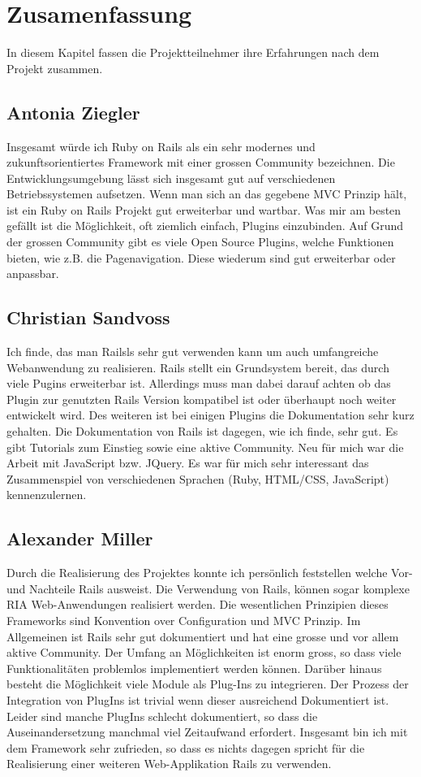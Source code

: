 \chapter{Zusamenfassung}
\label{sec:Zusammenfassung}
In diesem Kapitel fassen die Projektteilnehmer ihre Erfahrungen nach dem Projekt zusammen.
\section{Antonia Ziegler}
Insgesamt würde ich Ruby on Rails als ein sehr modernes und zukunftsorientiertes Framework mit einer grossen Community bezeichnen.
Die Entwicklungsumgebung lässt sich insgesamt gut auf verschiedenen Betriebssystemen aufsetzen. 
Wenn man sich an das gegebene MVC Prinzip hält, ist ein Ruby on Rails Projekt gut erweiterbar und wartbar. 
Was mir am besten gefällt ist die Möglichkeit, oft ziemlich einfach, Plugins einzubinden. Auf Grund der grossen Community gibt es viele Open Source Plugins, welche Funktionen bieten, wie z.B. die Pagenavigation. Diese wiederum sind gut erweiterbar oder anpassbar.
\section{Christian Sandvoss}
Ich finde, das man Railsls sehr gut verwenden kann um auch umfangreiche Webanwendung zu realisieren. Rails stellt ein Grundsystem bereit, das durch viele Pugins erweiterbar ist. Allerdings muss man dabei darauf achten ob das Plugin zur genutzten Rails Version kompatibel ist oder überhaupt noch weiter entwickelt wird. Des weiteren ist bei einigen Plugins die Dokumentation sehr kurz gehalten. Die Dokumentation von Rails ist dagegen, wie ich finde, sehr gut. Es gibt Tutorials zum Einstieg sowie eine aktive Community. Neu für mich war die Arbeit mit JavaScript bzw. JQuery. Es war für mich sehr interessant das Zusammenspiel von verschiedenen Sprachen (Ruby, HTML/CSS, JavaScript) kennenzulernen.

\section{Alexander Miller}
Durch die Realisierung des Projektes konnte ich persönlich feststellen welche Vor- und Nachteile Rails ausweist. Die Verwendung von Rails, können sogar komplexe RIA Web-Anwendungen realisiert werden. Die wesentlichen Prinzipien dieses Frameworks sind Konvention over Configuration und MVC Prinzip. Im Allgemeinen ist Rails sehr gut dokumentiert und hat eine grosse und vor allem aktive Community. Der Umfang an Möglichkeiten ist enorm gross, so dass viele Funktionalitäten problemlos implementiert werden können. Darüber hinaus besteht die Möglichkeit viele Module als Plug-Ins zu integrieren. Der Prozess der Integration von PlugIns ist trivial wenn dieser ausreichend Dokumentiert ist. Leider sind manche PlugIns schlecht dokumentiert, so dass die Auseinandersetzung manchmal viel Zeitaufwand erfordert. Insgesamt bin ich mit dem Framework sehr zufrieden, so dass es nichts dagegen spricht für die Realisierung einer weiteren Web-Applikation Rails zu verwenden.
